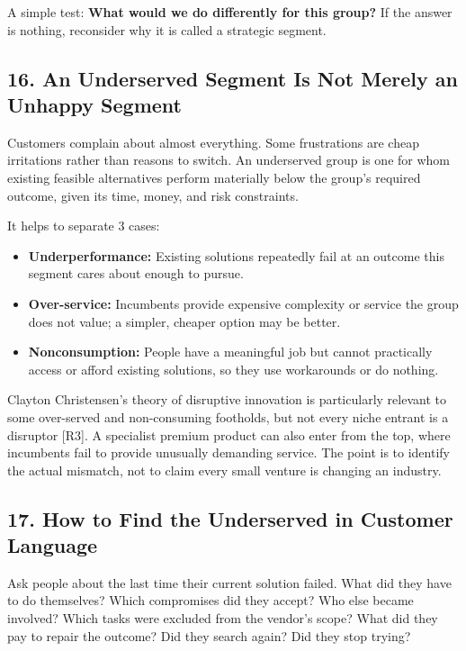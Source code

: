A simple test: \textbf{What would we do differently for this group?} If the answer is nothing, reconsider why it is called a strategic segment.

\subsection*{16. An Underserved Segment Is Not Merely an Unhappy Segment}

Customers complain about almost everything. Some frustrations are cheap irritations rather than reasons to switch. An underserved group is one for whom existing feasible alternatives perform materially below the group's required outcome, given its time, money, and risk constraints.

It helps to separate 3 cases:

\begin{itemize}
    \item \textbf{Underperformance:} Existing solutions repeatedly fail at an outcome this segment cares about enough to pursue.
    \item \textbf{Over-service:} Incumbents provide expensive complexity or service the group does not value; a simpler, cheaper option may be better.
    \item \textbf{Nonconsumption:} People have a meaningful job but cannot practically access or afford existing solutions, so they use workarounds or do nothing.
\end{itemize}

Clayton Christensen's theory of disruptive innovation is particularly relevant to some over-served and non-consuming footholds, but not every niche entrant is a disruptor [R3]. A specialist premium product can also enter from the top, where incumbents fail to provide unusually demanding service. The point is to identify the actual mismatch, not to claim every small venture is changing an industry.

\subsection*{17. How to Find the Underserved in Customer Language}

Ask people about the last time their current solution failed. What did they have to do themselves? Which compromises did they accept? Who else became involved? Which tasks were excluded from the vendor's scope? What did they pay to repair the outcome? Did they search again? Did they stop trying?

